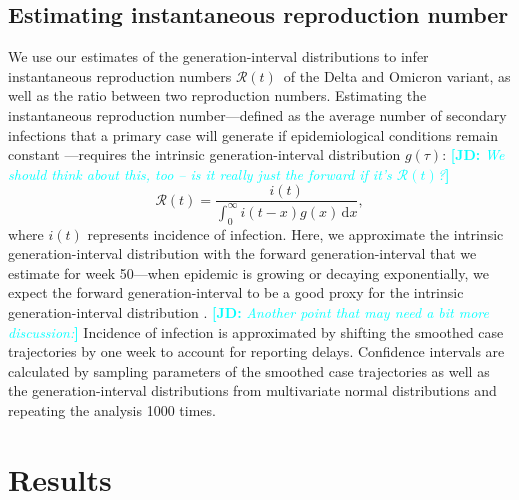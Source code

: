 \documentclass[12pt]{article}
\newcommand{\comment}{\showcomment}
\newcommand{\showcomment}[3]{\textcolor{#1}{\textbf{[#2: }\textsl{#3}\textbf{]}}}
\newcommand{\jd}[1]{\comment{cyan}{JD}{#1}}
\newcommand{\Rt}{\ensuremath{{\mathcal R}(t)}\xspace}
\newcommand{\dd}[1]{\ensuremath{\, \mathrm{d}#1}}
\newcommand{\dx}{\dd{x}}
\begin{document}
\subsection{Estimating instantaneous reproduction number}

We use our estimates of the generation-interval distributions to infer instantaneous reproduction numbers \Rt\ of the Delta and Omicron variant, as well as the ratio between two reproduction numbers.
Estimating the instantaneous reproduction number---defined as the average number of secondary infections that a primary case will generate if epidemiological conditions remain constant \citep{fraser2007estimating}---requires the intrinsic generation-interval distribution $g(\tau)$:
\jd{We should think about this, too -- is it really just the forward if it's \Rt?}
\begin{equation}
\Rt = \frac{i(t)}{\int_0^\infty i(t-x) g(x) \dx},
\end{equation}
where $i(t)$ represents incidence of infection.
Here, we approximate the intrinsic generation-interval distribution with the forward generation-interval that we estimate for week 50---when epidemic is growing or decaying exponentially, we expect the forward generation-interval to be a good proxy for the intrinsic generation-interval distribution \citep{champredon2015intrinsic, park2020inferring}.
\jd{Another point that may need a bit more discussion:}
Incidence of infection is approximated by shifting the smoothed case trajectories by one week to account for reporting delays.
Confidence intervals are calculated by sampling parameters of the smoothed case trajectories as well as the generation-interval distributions from multivariate normal distributions and repeating the analysis 1000 times.

\section{Results}
\end{document}
